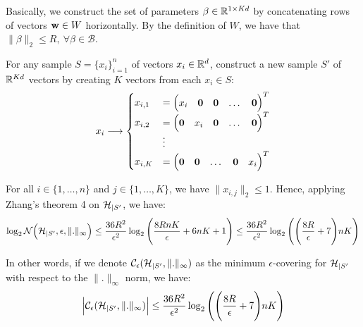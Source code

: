 \noindent Basically, we construct the set of parameters $\beta\in \mathbb{R}^{1\times Kd}$ by concatenating rows of vectors ${\bf w}\in W$ horizontally. By the definition of $W$, we have that $\|\beta\|_2\le R, \ \forall \beta\in\mathcal{B}$.

\noindent\newline\newline For any sample $S=\{x_i\}_{i=1}^n$ of vectors $x_i\in \mathbb{R}^d$, construct a new sample $S'$ of $\mathbb{R}^{Kd}$ vectors by creating $K$ vectors from each $x_i\in S$:
\begin{align*}
    x_i \longrightarrow \begin{cases}
        x_{i, 1} &= \begin{pmatrix} x_i & {\bf 0} & {\bf 0} & \dots & {\bf 0} \end{pmatrix}^T \\
        x_{i, 2} &= \begin{pmatrix} {\bf 0} & x_i & {\bf 0} & \dots & {\bf 0} \end{pmatrix}^T \\
        &\vdots \\
        x_{i, K} &=\begin{pmatrix} {\bf 0} & {\bf 0} & \dots & {\bf 0} & x_i \end{pmatrix}^T
    \end{cases}
\end{align*}

\noindent For all $i\in \{1, \dots, n\}$ and $j\in\{1, \dots, K\}$, we have $\|x_{i, j}\|_2 \le 1$. Hence, applying Zhang's theorem 4 \cite{article:tong_zhang} on $\mathcal{H}_{|S'}$, we have:
\begin{align*}
    \log_2\mathcal{N}\Big( \mathcal{H}_{|S'}, \epsilon, \|.\|_\infty \Big) \le \frac{36R^2}{\epsilon^2}\log_2\Bigg( 
        \frac{8RnK}{\epsilon} + 6nK + 1
     \Bigg) \le \frac{36R^2}{\epsilon^2}\log_2\Bigg( \Bigg( 
        \frac{8R}{\epsilon} + 7 \Bigg)nK
     \Bigg) 
\end{align*}

\noindent In other words, if we denote $\mathcal{C}_\epsilon(\mathcal{H}_{|S'}, \|.\|_\infty)$ as the minimum $\epsilon$-covering for $\mathcal{H}_{|S'}$ with respect to the $\|.\|_\infty$ norm, we have:
\begin{align*}
    \Big| 
        \mathcal{C}_\epsilon(\mathcal{H}_{|S'}, \|.\|_\infty)
     \Big| \le \frac{36R^2}{\epsilon^2}\log_2\Bigg( \Bigg( 
        \frac{8R}{\epsilon} + 7 \Bigg)nK
     \Bigg)
\end{align*}

